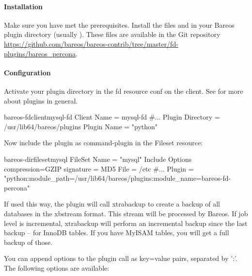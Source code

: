 \paragraph{Installation}

Make sure you have met the prerequisites.
Install the files  and  in your Bareos plugin directory (usually ). These files are available
in the Git repository \url{https://github.com/bareos/bareos-contrib/tree/master/fd-plugins/bareos_percona}.

\paragraph{Configuration}

Activate your plugin directory in the fd resource conf on the client. See  for more about plugins in general.

\begin{bareosConfigResource}{bareos-fd}{client}{mysql-fd}
Client {
  Name = mysql-fd
  #...
  Plugin Directory = /usr/lib64/bareos/plugins
  Plugin Name = "python"
}
\end{bareosConfigResource}

Now include the plugin as command-plugin in the Fileset resource:

\begin{bareosConfigResource}{bareos-dir}{fileset}{mysql}
FileSet {
    Name = "mysql"
    Include  {
        Options {
            compression=GZIP
            signature = MD5
        }
        File = /etc
        #...
        Plugin = "python:module_path=/usr/lib64/bareos/plugins:module_name=bareos-fd-percona"
    }
}
\end{bareosConfigResource}

If used this way, the plugin will call xtrabackup to create a backup of all databases in the xbstream format.
This stream will be processed by Bareos. If job level is incremental,
xtrabackup will perform an incremental backup since the last backup -- for InnoDB tables.
If you have MyISAM tables, you will get a full backup of those.

You can append options to the plugin call as key=value pairs, separated by ':'.
The following options are available:

